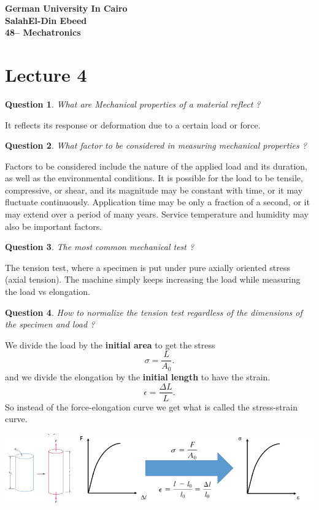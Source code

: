 \documentclass[13]{article}
\newtheorem{exer}{Question}
\begin{document}
\begin{center}
\LARGE \textbf{German University In Cairo
	\\ SalahEl-Din Ebeed 
	\\ 48-- Mechatronics 
}
\end{center}
\section{Lecture 4}
\begin{exer}
What are Mechanical properties of a material reflect ?
\end{exer}

It reflects its response or deformation due to a certain load or force.
\begin{exer}
What factor to be considered in measuring mechanical properties ?
\end{exer}
Factors to be considered include the nature of the applied load and its
duration, as well as the environmental conditions. It is possible for the
load to be tensile, compressive, or shear, and its magnitude may be constant
with time, or it may fluctuate continuously.  Application time may be only a
fraction of a second, or it may extend over a period of many years. Service
temperature and humidity may also be important factors.
\begin{exer}
The most common mechanical test  ?
\end{exer}
The tension test, where a specimen is put under pure axially oriented stress (axial tension). The machine simply keeps increasing the load while measuring the load vs elongation. 
\begin{exer}
How to normalize the tension test regardless of the dimensions of the specimen and load ?
\end{exer}
We divide the load by the \textbf{initial area}  to get the stress
\[
\sigma = \frac{L}{A_0} 
.\] 
and we divide the elongation by the \textbf{initial length }to have the strain. 
\[
\epsilon = \frac{\Delta L}{L} 
.\] 
So instead of the force-elongation curve we get what is called the stress-strain curve.
\\
\begin{center}
\includegraphics[scale=0.5]{figures/1.png}
\end{center}
\end{document}
